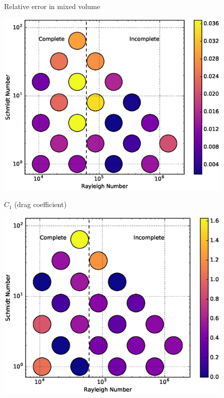 \documentclass[12pt]{beamer}
\begin{document}
\begin{frame}[t]{Relative error in mixed volume}
\begin{center}
\vspace{-11pt}
\includegraphics[width=0.85\textwidth]{graphics/MixingError-vs-Rayleigh-Schmidt.eps}
\end{center}
\end{frame}



\begin{frame}[t]{$C_1$ (drag coefficient)}
\begin{center}
\vspace{-11pt}
\includegraphics[width=0.85\textwidth]{graphics/C1-vs-Rayleigh-Schmidt.eps}
\end{center}
\end{frame}
\end{document}
